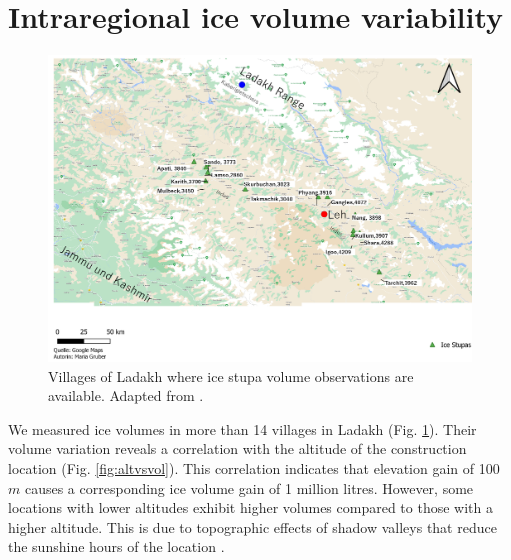 \section{Intraregional ice volume variability}

\begin{figure}[htb]
	\includegraphics[width=\textwidth]{figs/ISC_villages}
	\caption{Villages of Ladakh where ice stupa volume observations are available. Adapted from \citet{mariagruberIceStupasLadakh2022}.}
	\label{fig:villages}
\end{figure}

We measured ice volumes in more than 14 villages in Ladakh (Fig. \ref{fig:villages}). Their volume variation
reveals a correlation with the altitude of the construction location (Fig. \ref{fig:altvsvol}). This correlation
indicates that elevation gain of 100 $m$ causes a corresponding ice volume gain of 1 million litres. However,
some locations with lower altitudes exhibit higher volumes compared to those with a higher altitude. This is due
to topographic effects of shadow valleys that reduce the sunshine hours of the location
\citep{mariagruberIceStupasLadakh2022}.

